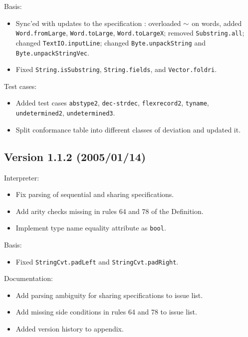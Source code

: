 \documentclass[twoside,titlepage]{article}
\begin{document}
\begin{appendix}
Basis:
\begin{itemize} \setlength{\itemsep}{0em}
\item Sync'ed with updates to the specification \cite{basis}: overloaded $\tt\sim$ on words, added {\tt Word.fromLarge}, {\tt Word.toLarge}, {\tt Word.toLargeX}; removed {\tt Substring.all}; changed {\tt TextIO.inputLine}; changed {\tt Byte.unpackString} and {\tt Byte.unpackStringVec}.
\item Fixed {\tt String.isSubstring}, {\tt String.fields}, and {\tt Vector.foldri}.
\end{itemize}

Test cases:
\begin{itemize} \setlength{\itemsep}{0em}
\item Added test cases {\tt abstype2}, {\tt dec-strdec}, {\tt flexrecord2}, {\tt tyname}, {\tt undetermined2}, {\tt undetermined3}.
\item Split conformance table into different classes of deviation and updated it.
\end{itemize}

\subsection*{Version 1.1.2 (2005/01/14)}

Interpreter:
\begin{itemize} \setlength{\itemsep}{0em}
\item Fix parsing of sequential and sharing specifications.
\item Add arity checks missing in rules 64 and 78 of the Definition.
\item Implement type name equality attribute as {\tt bool}.
\end{itemize}

Basis:
\begin{itemize} \setlength{\itemsep}{0em}
\item Fixed {\tt StringCvt.padLeft} and {\tt StringCvt.padRight}.
\end{itemize}

Documentation:
\begin{itemize} \setlength{\itemsep}{0em}
\item Add parsing ambiguity for sharing specifications to issue list.
\item Add missing side conditions in rules 64 and 78 to issue list.
\item Added version history to appendix.
\end{itemize}


\end{appendix}
\end{document}
